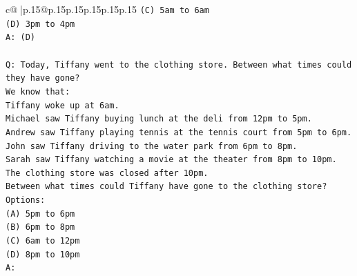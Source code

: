 \documentclass{article}
\begin{document}
{\begin{supertabular}{c@{$\;$}|p{.15\linewidth}@{}p{.15\linewidth}p{.15\linewidth}p{.15\linewidth}p{.15\linewidth}p{.15\linewidth}}
{{{\texttt{(C) 5am to 6am} \\
\texttt{(D) 3pm to 4pm} \\
\texttt{A: (D)} \\
\\ 
\texttt{Q: Today, Tiffany went to the clothing store. Between what times could they have gone?} \\
\texttt{We know that:} \\
\texttt{Tiffany woke up at 6am.} \\
\texttt{Michael saw Tiffany buying lunch at the deli from 12pm to 5pm.} \\
\texttt{Andrew saw Tiffany playing tennis at the tennis court from 5pm to 6pm.} \\
\texttt{John saw Tiffany driving to the water park from 6pm to 8pm.} \\
\texttt{Sarah saw Tiffany watching a movie at the theater from 8pm to 10pm.} \\
\texttt{The clothing store was closed after 10pm.} \\
\texttt{Between what times could Tiffany have gone to the clothing store?} \\
\texttt{Options:} \\
\texttt{(A) 5pm to 6pm} \\
\texttt{(B) 6pm to 8pm} \\
\texttt{(C) 6am to 12pm} \\
\texttt{(D) 8pm to 10pm} \\
\texttt{A:} \\
            }
        }
    }
     \\ \\


\end{supertabular}}
\end{document}
